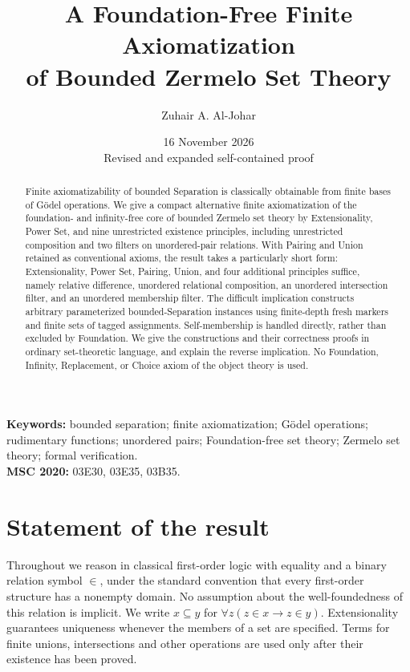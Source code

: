 \documentclass[11pt,a4paper]{article}
\title{\vspace{-2.3em}\textbf{A Foundation-Free Finite Axiomatization\\[3pt] of Bounded Zermelo Set Theory}}
\author{Zuhair A. Al-Johar}
\date{16 November 2026\\[2pt]\small Revised and expanded self-contained proof}
\numberwithin{equation}{section}
\begin{document}
\maketitle
\begin{abstract}
Finite axiomatizability of bounded Separation is classically obtainable from finite bases of G\"odel operations.  We give a compact alternative finite axiomatization of the foundation- and infinity-free core of bounded Zermelo set theory by Extensionality, Power Set, and nine unrestricted existence principles, including unrestricted composition and two filters on unordered-pair relations.  With Pairing and Union retained as conventional axioms, the result takes a particularly short form: Extensionality, Power Set, Pairing, Union, and four additional principles suffice, namely relative difference, unordered relational composition, an unordered intersection filter, and an unordered membership filter.  The difficult implication constructs arbitrary parameterized bounded-Separation instances using finite-depth fresh markers and finite sets of tagged assignments.  Self-membership is handled directly, rather than excluded by Foundation.  We give the constructions and their correctness proofs in ordinary set-theoretic language, and explain the reverse implication.  No Foundation, Infinity, Replacement, or Choice axiom of the object theory is used.
\end{abstract}
\noindent\textbf{Keywords:} bounded separation; finite axiomatization; G\"odel operations; rudimentary functions; unordered pairs; Foundation-free set theory; Zermelo set theory; formal verification.\\
\textbf{MSC 2020:} 03E30, 03E35, 03B35.

\section{Statement of the result}
Throughout we reason in classical first-order logic with equality and a binary relation symbol $\in$, under the standard convention that every first-order structure has a nonempty domain.  No assumption about the well-foundedness of this relation is implicit.  We write $x\subseteq y$ for $\forall z(z\in x\rightarrow z\in y)$.  Extensionality guarantees uniqueness whenever the members of a set are specified.  Terms for finite unions, intersections and other operations are used only after their existence has been proved.
\end{document}
